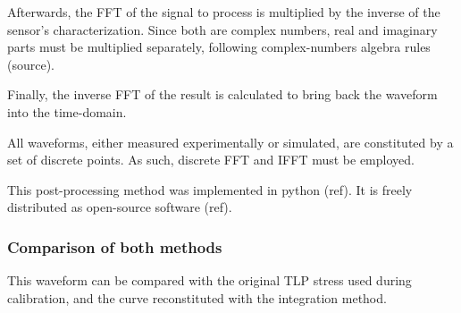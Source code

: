 Afterwards, the FFT of the signal to process is multiplied by the inverse of the sensor's characterization.
Since both are complex numbers, real and imaginary parts must be multiplied separately, following complex-numbers algebra rules (source).


Finally, the inverse FFT of the result is calculated to bring back the waveform into the time-domain.

All waveforms, either measured experimentally or simulated, are constituted by a set of discrete points.
As such, discrete FFT and IFFT must be employed.

This post-processing method was implemented in python (ref).
It is freely distributed as open-source software (ref).

\subsubsection{Comparison of both methods}
This waveform can be compared with the original TLP stress used during calibration, and the curve reconstituted with the integration method.
